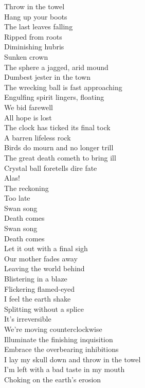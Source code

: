 Throw in the towel\\
Hang up your boots\\
The last leaves falling\\
Ripped from roots\\
Diminishing hubris\\
Sunken crown\\
The sphere a jagged, arid mound\\
Dumbest jester in the town\\
The wrecking ball is fast approaching\\
Engulfing spirit lingers, floating\\
We bid farewell\\
All hope is lost\\
The clock has ticked its final tock\\
A barren lifeless rock\\

Birds do mourn and no longer trill\\
The great death cometh to bring ill\\
Crystal ball foretells dire fate\\
Alas!\\
The reckoning\\
Too late\\

Swan song\\
Death comes\\
Swan song\\
Death comes\\

Let it out with a final sigh\\
Our mother fades away\\
Leaving the world behind\\
Blistering in a blaze\\
Flickering flamed-eyed\\
I feel the earth shake\\
Splitting without a splice\\
It's irreversible\\
We're moving counterclockwise\\
Illuminate the finishing inquisition\\
Embrace the overbearing inhibitions\\
I lay my skull down and throw in the towel\\
I'm left with a bad taste in my mouth\\
Choking on the earth's erosion\\

